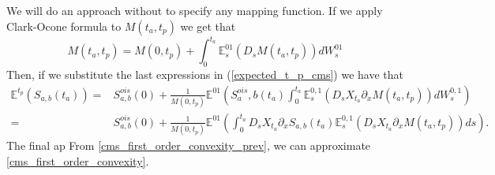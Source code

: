 \documentclass[a4paper,10pt]{article}
\newcommand{\1}{\mathbf{1}}
\begin{document}
We will do an approach without to specify any mapping function. If we apply Clark-Ocone formula to $M(t_a,t_p)$ we get that
\begin{equation} \label{clark_ocone_swap_m}
M(t_a,t_p) = M(0,t_p)+ \int_{0}^{t_a} \mathbb{E}_s^{01}\left(D_s M(t_a,t_p)\right) dW^{01}_s
\end{equation}
Then, if we substitute the last expressions in (\ref{expected_t_p_cms}) we have that
\begin{align}\label{cms_first_order_convexity_prev}
\mathbb{E}^{t_p}\left(S_{a,b}(t_a)\right) =& S^{ois}_{a,b}(0) + \frac{1}{M(0,t_p)} \mathbb{E}^{01}\left( S^{ois}_a,b(t_a) \int_{0}^{t_a} \mathbb{E}^{0,1}_s\left(D_sX_{t_a}\partial_x M(t_a,t_p)  \right) dW^{0,1}_s   \right) \nonumber \\
=&  S^{ois}_{a,b}(0) + \frac{1}{M(0,t_p)} \mathbb{E}^{01}\left(\int_{0}^{t_a} D_s X_{t_a} \partial_x S_{a,b}(t_a) \mathbb{E}^{0,1}_s\left(D_sX_{t_a}\partial_x M(t_a,t_p)  \right) ds   \right).
\end{align}
The final ap
From \eqref{cms_first_order_convexity_prev}, we can approximate \eqref{cms_first_order_convexity}.


%
\end{document}
